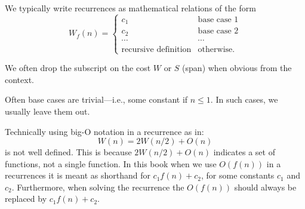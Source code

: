 \begin{cluster}
\label{grp:grm:analysis::recurrences::syntax}

\begin{gram}[Syntax]
\label{grm:analysis::recurrences::syntax}
We typically write recurrences as mathematical relations of the form
\[
W_f(n) = \left\{
\begin{array}{lll}
c_1 & \mbox{base case 1} 
\\
c_2 & \mbox{base case 2} 
\\
\cdots& \cdots
\\
\mbox{recursive definition}  &  \mbox{otherwise}.
\end{array}
\right. 
\]

\end{gram}
\end{cluster}

\begin{cluster}
\label{grp:grm:analysis::recurrences::dropping-the-subscript}

\begin{gram}
\label{grm:analysis::recurrences::dropping-the-subscript}
We often drop the subscript on the cost $W$ or $S$ (span) when obvious from the context.

\end{gram}
\end{cluster}

\begin{cluster}
\label{grp:grm:analysis::recurrences::base-case}

\begin{gram}
\label{grm:analysis::recurrences::base-case}
Often  base cases are trivial---i.e., some constant if $n
\leq 1$.  In such cases, we usually leave them out.

\end{gram}
\end{cluster}

\begin{cluster}
\label{grp:grm:analysis::recurrences::big-o-inside-a-recurrence}

\begin{gram}
\label{grm:analysis::recurrences::big-o-inside-a-recurrence}
Technically using big-O notation in a recurrence as in:
\[ 
W(n) = 2 W(n/2) + O(n) 
\]
is not well defined.   
This is because $2 W(n/2) + O(n)$ indicates a
set of functions, not a single function.    
In this book when we use
$O(f(n))$ in a recurrences it is meant as shorthand for $c_1 f(n) +
c_2$, for some constants $c_1$ and $c_2$. 
Furthermore, when solving the recurrence the $O(f(n))$ should
always be replaced by $c_1 f(n) + c_2$.

\end{gram}
\end{cluster}

